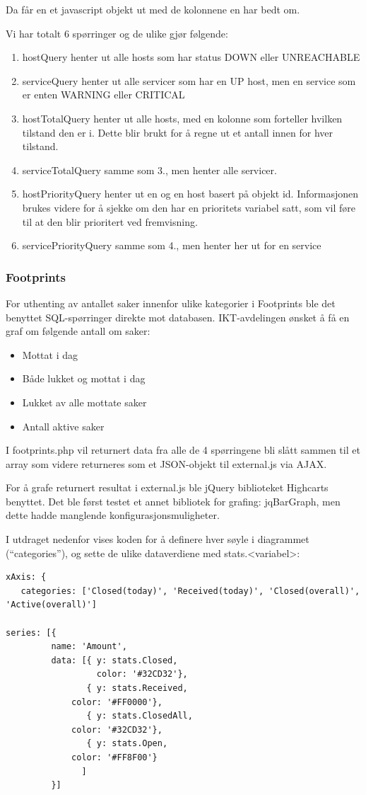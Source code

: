 Da får en et javascript objekt ut med de kolonnene en har bedt om.

Vi har totalt 6 spørringer og de ulike gjør følgende:
\begin{enumerate}
	\item  hostQuery henter ut alle hosts som har status DOWN eller UNREACHABLE
	\item  serviceQuery henter ut alle servicer som har en UP host, men en service som er enten WARNING eller CRITICAL
	\item  hostTotalQuery henter ut alle hosts, med en kolonne som forteller hvilken tilstand den er i. Dette blir brukt for å regne ut et antall innen for hver tilstand.
	\item  serviceTotalQuery samme som 3., men henter alle servicer.
	\item  hostPriorityQuery henter ut en og en host basert på objekt id. Informasjonen brukes videre for å sjekke om den har en prioritets variabel satt, som vil føre til at den blir prioritert ved fremvisning.
	\item  servicePriorityQuery samme som 4., men henter her ut for en service
\end{enumerate}

\subsubsection{Footprints}

For uthenting av antallet saker innenfor ulike kategorier i Footprints ble det benyttet SQL-spørringer direkte mot databasen. IKT-avdelingen ønsket å få en graf om følgende antall om saker:
\begin{itemize}
	\item Mottat i dag
	\item Både lukket og mottat i dag
	\item Lukket av alle mottate saker
	\item Antall aktive saker
\end{itemize}

I footprints.php vil returnert data fra alle de 4 spørringene bli slått sammen til et array som videre returneres som et JSON-objekt til external.js via AJAX. 

For å grafe returnert resultat i external.js ble jQuery biblioteket Highcarts benyttet. Det ble først testet et annet bibliotek for grafing: jqBarGraph, men dette hadde manglende konfigurasjonsmuligheter.  

I utdraget nedenfor vises koden for å definere hver søyle i diagrammet (“categories”), og sette de ulike dataverdiene med stats.<variabel>:
\begin{lstlisting}
xAxis: {
   categories: ['Closed(today)', 'Received(today)', 'Closed(overall)', 'Active(overall)']

series: [{
         name: 'Amount',
         data: [{ y: stats.Closed,
                  color: '#32CD32'},
                { y: stats.Received,
             color: '#FF0000'},
                { y: stats.ClosedAll,
             color: '#32CD32'},
                { y: stats.Open,
             color: '#FF8F00'}
               ]
         }]
\end{lstlisting}

